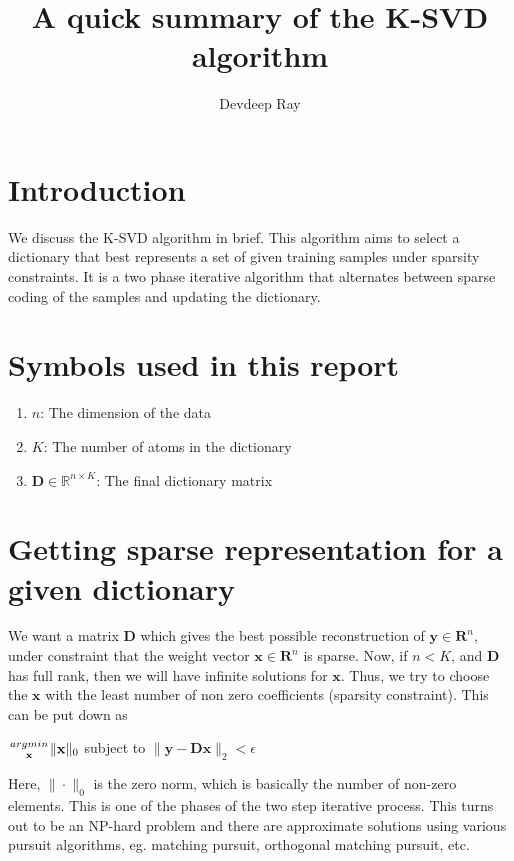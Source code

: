 \documentclass[10pt,a4paper,final]{article}
\title{A quick summary of the K-SVD algorithm}
\author{Devdeep Ray}
\begin{document}
\maketitle
\section{Introduction}
We discuss the K-SVD algorithm in brief. This algorithm aims to select a dictionary that best represents a set of given training samples under sparsity constraints. It is a two phase iterative algorithm that alternates between sparse coding of the samples and updating the dictionary.
\section{Symbols used in this report}
\begin{enumerate}
\item $n$: The dimension of the data
\item $K$: The number of atoms in the dictionary
\item $\mathbf{D} \in \mathbb{R}^{n \times K}$: The final dictionary matrix
\end{enumerate}
\section{Getting sparse representation for a given dictionary}
We want a matrix $\mathbf{D}$ which gives the best possible reconstruction of $\mathbf{y} \in \mathbf{R}^n$, under constraint that the weight vector $\mathbf{x} \in \mathbf{R}^n$ is sparse. Now, if $n < K$, and $\mathbf{D}$ has full rank, then we will have infinite solutions for $\mathbf{x}$. Thus, we try to choose the $\mathbf{x}$ with the least number of non zero coefficients (sparsity constraint). This can be put down as\\
\begin{center}
$\genfrac{}{}{0pt}{}{argmin}{\mathbf{x}}\|\mathbf{x}\|_0$ subject to $\|\mathbf{y} - \mathbf{Dx}\|_2 < \epsilon$ 
\end{center}
Here, $\|\cdot\|_0$ is the zero norm, which is basically the number of non-zero elements. This is one of the phases of the two step iterative process. This turns out to be an NP-hard problem and there are approximate solutions using various pursuit algorithms, eg. matching pursuit, orthogonal matching pursuit, etc.
\end{document}
